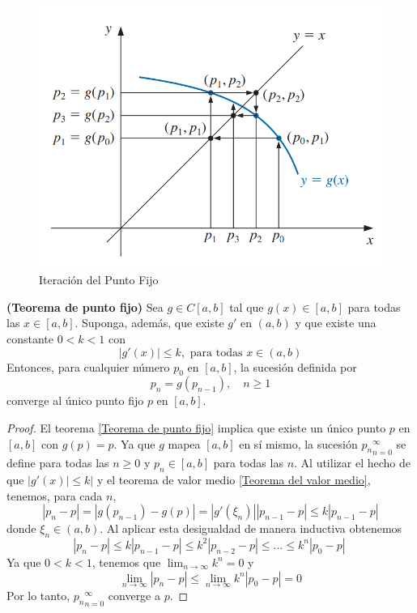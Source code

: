 \begin{figure}[h]
    \centering
    \includegraphics[width = 0.5 \textwidth]{Imagenes/6 - Iteracion del Punto Fijo a.png}
    \caption{Iteración del Punto Fijo}
    \label{fig: Iteracion del Punto Fijo}
\end{figure}

\begin{theorem}
    \label{Teorema de punto fijo}
    \textbf{(Teorema de punto fijo)} Sea $g \in C [a, b]$ tal que $g(x) \in [a, b]$ para todas las $x \in [a, b]$. Suponga, además, que existe $g'$ en $(a, b)$ y que existe una constante $0 < k < 1$ con
    \[ |g'(x)| \leq k, \text{ para todas } x \in (a, b) \]
    Entonces, para cualquier número $p_0$ en $[a, b]$, la sucesión definida por 
    \[ p_n = g(p_{n - 1}), \quad n \geq 1 \]
    converge al único punto fijo $p$ en $[a, b]$.
\end{theorem}

\begin{proof}
    El teorema \ref{Teorema de punto fijo} implica que existe un único punto $p$ en $[a, b]$ con $g(p) = p$. Ya que $g$ mapea $[a, b]$ en sí mismo, la sucesión ${p_n}_{n = 0}^\infty$ se define para todas las $n \geq 0$ y $p_n \in [a, b]$ para todas las $n$. Al utilizar el hecho de que $|g'(x)| \leq k|$ y el teorema de valor medio \ref{Teorema del valor medio}, tenemos, para cada $n$,
    \[ |p_n - p| = |g(p_{n - 1}) - g(p)| = |g'(\xi_n)| |p_{n - 1} - p| \leq k |p_{n - 1} - p| \]
    donde $\xi_n \in (a, b)$. Al aplicar esta desigualdad de manera inductiva obtenemos
    \begin{equation}
        |p_n - p| \leq k |p_{n - 1} - p| \leq k^2 |p_{n-2} - p| \leq ... \leq k^n |p_0 - p|\
    \end{equation}
    Ya que $0 < k < 1$, tenemos que $\lim_{n \rightarrow \infty}k^n = 0$ y
    \[ \lim_{n \rightarrow \infty} |p_n - p| \leq \lim_{n \rightarrow \infty} k^n |p_0 - p| = 0 \]
    Por lo tanto, ${p_n}_{n = 0}^\infty$ converge a $p$.
\end{proof}

